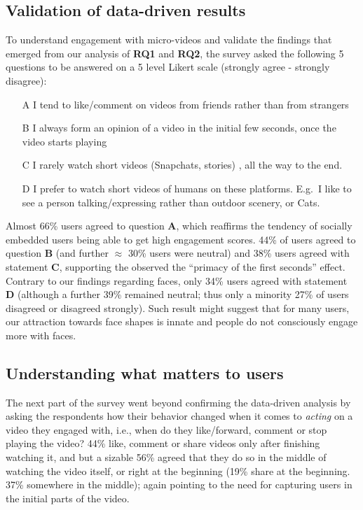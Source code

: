 \subsection{Validation of data-driven results}
To understand engagement with micro-videos and validate the findings that emerged from our analysis of \textbf{RQ1} and \textbf{RQ2}, the survey asked the following 5 questions
to be answered on a 5 level Likert scale (strongly agree - strongly disagree):
\begin{enumerate}
    \small 
    \item [A] I tend to like/comment on videos from friends rather than from strangers
    \item [B] I always form an opinion of a video in the initial few seconds, once the video starts playing
    \item [C] I rarely watch short videos (Snapchats, stories) , all the way to the end.
    \item [D] I prefer to watch short videos of humans on these platforms. E.g.\ I like to see a person talking/expressing rather than outdoor scenery, or Cats.
\end{enumerate}

Almost 66\% users agreed to question \textbf{A}, which reaffirms the tendency of socially embedded users being able to get high engagement scores. 44\% of users agreed to question \textbf{B} (and further $\approx$ 30\% users were neutral) and 38\% users agreed with statement \textbf{C}, supporting the observed the ``primacy of the first seconds'' effect.
Contrary to our findings regarding faces, only 34\% users agreed with statement  \textbf{D} (although a further 39\% remained neutral; thus only a minority 27\% of users disagreed or disagreed strongly). Such result might suggest that for many users, our attraction towards face shapes is innate \cite{slater1998innate} and people do not consciously engage more with faces. %

\subsection{Understanding what matters to users}
The next part of the survey went beyond confirming the data-driven analysis by asking the respondents how their behavior changed when it comes to \emph{acting} on a video they engaged with, i.e., when do they like/forward, comment or stop playing the video? 44\% like, comment or share videos only after finishing watching it, and but a sizable 56\% agreed that they do so in the middle of watching the video itself, or right at the beginning (19\% share at the beginning. 37\% somewhere in the middle); again pointing to the need for capturing users in the initial parts of the video. 

